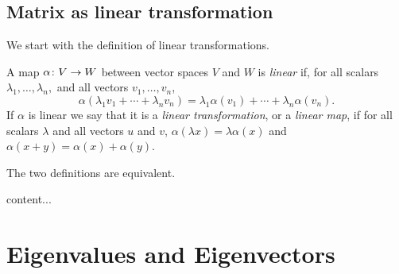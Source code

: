 \documentclass[main.tex]{subfiles}
\begin{document}
		\subsection{Matrix as linear transformation}
			We start with the definition of linear transformations.
			\begin{definition}
				A map $\alpha \colon V \rightarrow W$ between vector spaces $V$ and $W$ is \textit{linear} if, for all scalars $\lambda_1, \ldots, \lambda_n,$ and all vectors $v_1, \ldots, v_n$,
				\begin{equation*}
					\alpha\left(\lambda_1v_1 + \cdots + \lambda_n v_n\right) = \lambda_1\alpha(v_1) + \cdots + \lambda_n\alpha(v_n).
				\end{equation*}
			If $\alpha$ is linear we say that it is a \textit{linear transformation}, or a \textit{linear map}, if for all scalars $\lambda$ and all vectors $u$ and $v$, $\alpha(\lambda x) = \lambda\alpha(x)$ and $\alpha( x + y) = \alpha (x) + \alpha(y)$.
			\end{definition}
		The two definitions are equivalent.
			\begin{theorem}
				content...
			\end{theorem}
		
		\section{Eigenvalues and Eigenvectors}
\end{document}
